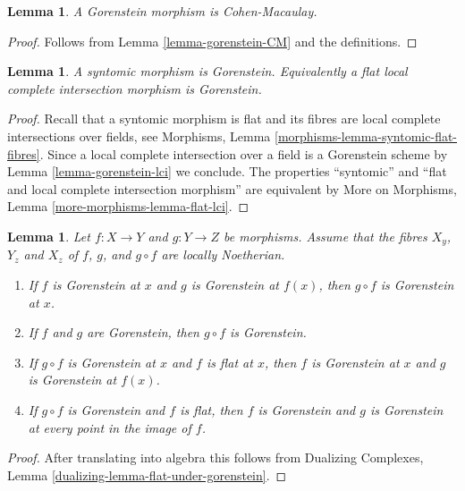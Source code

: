 \documentclass{stacks-project}
\theoremstyle{plain}
\newtheorem{lemma}[subsection]{Lemma}
\theoremstyle{definition}
\theoremstyle{remark}
\numberwithin{equation}{subsection}
\begin{document}
\begin{lemma}
\label{lemma-gorenstein-CM-morphism}
A Gorenstein morphism is Cohen-Macaulay.
\end{lemma}

\begin{proof}
Follows from Lemma \ref{lemma-gorenstein-CM} and the definitions.
\end{proof}

\begin{lemma}
\label{lemma-lci-gorenstein}
A syntomic morphism is Gorenstein. Equivalently a flat
local complete intersection morphism is Gorenstein.
\end{lemma}

\begin{proof}
Recall that a syntomic morphism is flat and its fibres
are local complete intersections over fields, see
Morphisms, Lemma \ref{morphisms-lemma-syntomic-flat-fibres}.
Since a local complete intersection over a field is a Gorenstein scheme
by Lemma \ref{lemma-gorenstein-lci} we conclude.
The properties ``syntomic'' and ``flat and local
complete intersection morphism'' are equivalent by
More on Morphisms, Lemma \ref{more-morphisms-lemma-flat-lci}.
\end{proof}

\begin{lemma}
\label{lemma-composition-gorenstein}
Let $f : X \to Y$ and $g : Y \to Z$ be morphisms. Assume that the
fibres $X_y$, $Y_z$ and $X_z$ of $f$, $g$, and $g \circ f$ are
locally Noetherian.
\begin{enumerate}
\item If $f$ is Gorenstein at $x$ and $g$ is Gorenstein
at $f(x)$, then $g \circ f$ is Gorenstein at $x$.
\item If $f$ and $g$ are Gorenstein, then $g \circ f$ is Gorenstein.
\item If $g \circ f$ is Gorenstein at $x$ and $f$ is flat at $x$,
then $f$ is Gorenstein at $x$ and $g$ is Gorenstein at $f(x)$.
\item If $g \circ f$ is Gorenstein and $f$ is flat, then
$f$ is Gorenstein and $g$ is Gorenstein at every point in
the image of $f$.
\end{enumerate}
\end{lemma}

\begin{proof}
After translating into algebra this follows from
Dualizing Complexes, Lemma \ref{dualizing-lemma-flat-under-gorenstein}.
\end{proof}
\end{document}
